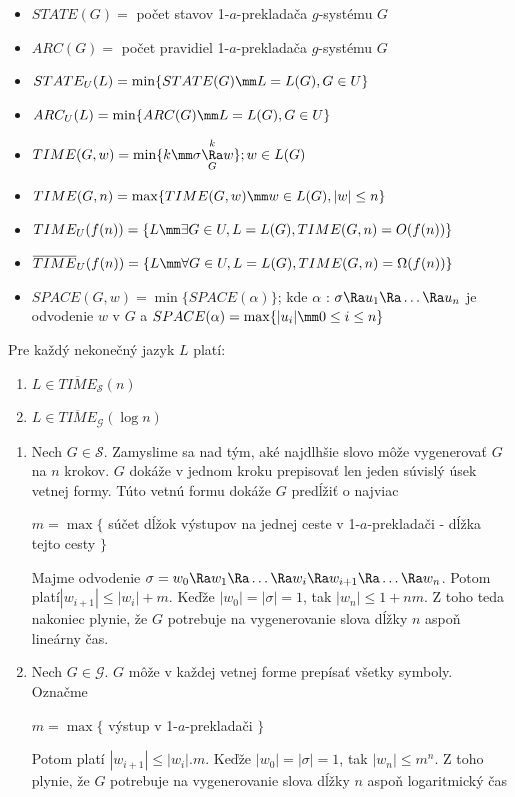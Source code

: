 \begin{itemize}
\item $STATE(G)=$ počet stavov 1-$a$-prekladača $g$-systému $G$
\item $ARC(G)=$ počet pravidiel 1-$a$-prekladača $g$-systému $G$
\item $STATE_U(L)=\min\{ STATE(G)\mm L=L(G), G\in U\}$
\item $ARC_U(L)=\min\{ ARC(G)\mm L=L(G), G\in U\}$
\item $TIME(G,w)=\min\{ k\mm\sigma\overset{k}{\underset{G}{\Ra}} w\}; w\in L(G)$
\item $TIME(G,n)=\max\{ TIME(G,w)\mm w\in L(G), |w|\leq n\}$
\item $TIME_U(f(n))=\{ L \mm \exists G\in U, L=L(G), TIME(G,n)=O(f(n))\}$
\item $\overline{TIME}_U(f(n))=\{ L\mm\forall G\in U, L=L(G), TIME(G,n)=\Omega(f(n))\}$
\item $SPACE(G,w)=\min\{ SPACE(\alpha )\}$; kde $\alpha$ : $\sigma\Ra u_1\Ra\dots\Ra u_n$ je odvodenie $w$ v $G$
a $SPACE(\alpha)=\max\{|u_i|\mm 0\leq i\leq n\}$
\end{itemize}

\begin{veta}
Pre každý nekonečný jazyk $L$ platí:
\begin{enumerate}
\item $L\in\overline{TIME}_{\mathcal{S}}(n)$
\item $L\in\overline{TIME}_{\mathcal{G}}(\log n)$
\end{enumerate}
\end{veta}

\begin{dokaz}
\begin{enumerate}
\item Nech $G\in\mathcal{S}$. Zamyslime sa nad tým, aké najdlhšie
slovo môže vygenerovať $G$ na $n$ krokov. $G$ dokáže v jednom
kroku prepisovať len jeden súvislý úsek vetnej formy. Túto vetnú
formu dokáže $G$ predĺžiť o najviac

\centerline{$m=\max\{$ súčet dĺžok výstupov na jednej ceste v
1-$a$-prekladači - dĺžka tejto cesty $\}$} Majme odvodenie $\sigma
=w_0\Ra w_1\Ra\dots\Ra w_i\Ra w_{i+1}\Ra\dots\Ra w_n$. Potom
platí\linebreak $|w_{i+1}|\leq |w_i| + m$. Keďže $|w_0|=|\sigma
|=1$, tak $|w_n|\leq 1 + nm$. Z toho teda nakoniec plynie, že $G$
potrebuje na vygenerovanie slova dĺžky $n$ aspoň lineárny čas.
\item Nech $G\in\mathcal{G}$. $G$ môže v každej vetnej forme
prepísať všetky symboly. Označme

\centerline{$m=\max\{$ výstup v 1-$a$-prekladači $\}$} Potom platí
$|w_{i+1}|\leq |w_i|.m$. Keďže $|w_0|=|\sigma |=1$, tak $|w_n|\leq
m^n$. Z toho plynie, že $G$ potrebuje na vygenerovanie slova dĺžky
$n$ aspoň logaritmický čas
\end{enumerate}
\end{dokaz}

